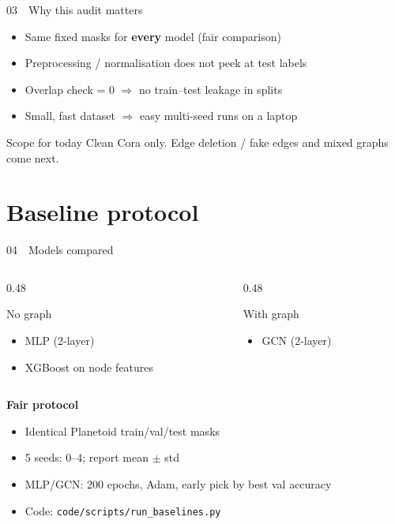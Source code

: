 \documentclass[
  english,
  aspectratio=169,
]{beamer}
\begin{document}
\begin{frame}{03~~Why this audit matters}
  \begin{itemize}
    \item Same fixed masks for \textbf{every} model (fair comparison)
    \item Preprocessing / normalisation does not peek at test labels
    \item Overlap check = 0 $\Rightarrow$ no train--test leakage in splits
    \item Small, fast dataset $\Rightarrow$ easy multi-seed runs on a laptop
  \end{itemize}

  \vspace{0.6em}
  \begin{alertblock}{Scope for today}
    Clean Cora only. Edge deletion / fake edges and mixed graphs come next.
  \end{alertblock}
\end{frame}

\section{Baseline protocol}

\begin{frame}{04~~Models compared}
  \begin{columns}[T]
    \begin{column}{0.48\textwidth}
      \begin{block}{No graph}
        \begin{itemize}
          \item MLP (2-layer)
          \item XGBoost on node features
        \end{itemize}
      \end{block}
    \end{column}
    \begin{column}{0.48\textwidth}
      \begin{block}{With graph}
        \begin{itemize}
          \item GCN (2-layer)
        \end{itemize}
      \end{block}
    \end{column}
  \end{columns}

  \vspace{0.7em}
  \textbf{Fair protocol}
  \begin{itemize}
    \item Identical Planetoid train/val/test masks
    \item 5 seeds: 0--4; report mean $\pm$ std
    \item MLP/GCN: 200 epochs, Adam, early pick by best val accuracy
    \item Code: \texttt{code/scripts/run\_baselines.py}
  \end{itemize}
\end{frame}
\end{document}
